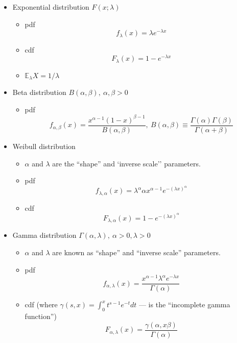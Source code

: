 \documentclass[12pt]{article}
\theoremstyle{definition}
\theoremstyle{remark}
\numberwithin{equation}{section}
\newcommand{\EE}{\mathbb{E}}
\begin{document}
\begin{itemize}
	\item Exponential distribution $F(x;\lambda)$
	\begin{itemize}
		\item pdf
		\begin{equation}\label{exponential_pdf}
			f_\lambda(x) = \lambda e^{-\lambda x}
		\end{equation}
		\item cdf
		\begin{equation}\label{exponential_cdf}
			F_\lambda(x) = 1 - e^{-\lambda x}
		\end{equation}
		\item $\EE_\lambda X = 1/\lambda$

	\end{itemize}

	\item Beta distribution $B(\alpha, \beta),\ \alpha, \beta > 0$
	\begin{itemize}
		\item pdf
		\begin{equation}\label{beta_pdf}
			f_{\alpha, \beta}(x) = \frac{x^{\alpha-1} (1-x)^{\beta-1}}{B(\alpha, \beta)},\ B(\alpha, \beta) \equiv \frac{\Gamma(\alpha)\Gamma(\beta)}{\Gamma(\alpha+\beta)}
		\end{equation}

	\end{itemize}

	\item Weibull distribution
	\begin{itemize}
		\item $\alpha$ and $\lambda$ are the ``shape'' and `inverse scale'' parameters.
		\item pdf
		\begin{equation}\label{weibull_pdf}
			f_{\lambda, \alpha}(x) = \lambda^{\alpha}\alpha x^{\alpha-1} e^{-(\lambda x)^{\alpha}}
		\end{equation}
		\item cdf
		\begin{equation}\label{weibull_cdf}
			F_{\lambda, \alpha}(x) = 1 - e^{-(\lambda x)^\alpha}
		\end{equation}
	\end{itemize}

	\item Gamma distribution $\Gamma(\alpha, \lambda),\ \alpha >0, \lambda > 0$
	\begin{itemize}
		\item $\alpha$ and $\lambda$ are known as ``shape'' and ``inverse scale'' parameters.
		\item pdf
			\begin{equation}\label{gamma_pdf}
				f_{\alpha, \lambda} (x)= \frac{x^{\alpha - 1} \lambda^{\alpha}e^{-\lambda x}}{\Gamma(\alpha)}
			\end{equation}
		\item cdf (where $\gamma(s, x) = \int_0^x t^{s-1}e^{-t}dt$ --- is the ``incomplete gamma function'')
			\begin{equation}
				F_{\alpha,\lambda}(x) = \frac{\gamma(\alpha, x\beta)}{\Gamma(\alpha)}
			\end{equation}



\end{itemize}
\end{itemize}
\end{document}
